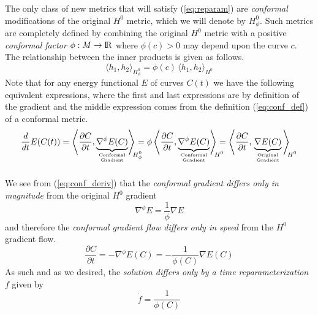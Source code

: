 \documentclass[twoside,a4paper,english]{article}
\newcommand\deriv[2][]{\frac{d #1}{d #2}}
\newcommand\pderiv[2][]{\frac{\partial #1}{\partial #2}}
\begin{document}
The only class of new metrics that will satisfy (\ref{eq:reparam}) are
{\em conformal} modifications of the original $H^0$ metric, which we
will denote by $H^0_\phi$. Such metrics
are completely defined by combining the original $H^0$ metric with a
positive {\em conformal factor} $\phi:M\to{\protect\mathrm{l\hskip-0.15em R}}$ where $\phi(c)>0$ may
depend upon the curve $c$. The relationship between the inner products
is given as follows.
\begin{equation}\label{eq:conf_def}
  \Big\langle h_1,h_2\Big\rangle_{\!H^0_\phi}=
  \phi(c)\,\Big\langle h_1,h_2\Big\rangle_{\!H^0}
\end{equation}
Note that for any energy functional $E$ of curves $C(t)$ we have
the following equivalent expressions, where the first and last expressions
are by definition of the gradient and the middle expression comes from
the definition (\ref{eq:conf_def}) of a conformal metric.
\begin{equation}\label{eq:conf_deriv}
  \deriv{t}E(C(t))
   =\left\langle \pderiv[C]{t},
      \underbrace{\nabla^\phi E(C)}_
        {\parbox{3.5em}{\vspace{-2.5ex}\tiny\begin{center}Conformal\\Gradient\end{center}}}
    \right\rangle_{\!\!\raisebox{4ex}{$\scriptstyle H^0_\phi$}}
   \!\!\!\!\!
   =\phi\left\langle \pderiv[C]{t},
      \underbrace{\nabla^\phi E(C)}_
        {\parbox{3.5em}{\vspace{-2.5ex}\tiny\begin{center}Conformal\\Gradient\end{center}}}
    \right\rangle_{\!\!\raisebox{4ex}{$\scriptstyle H^0$}}
   \!\!\!\!\!
   =\left\langle \pderiv[C]{t},
      \underbrace{\nabla E(C)}_
        {\parbox{3.5em}{\vspace{-2.5ex}\tiny\begin{center}Original\\Gradient\end{center}}}
    \right\rangle_{\!\!\raisebox{4ex}{$\scriptstyle H^0$}}
\end{equation}
We see from (\ref{eq:conf_deriv}) that the 
{\em conformal gradient differs only in magnitude} from the original
$H^0$ gradient
$$
  \nabla^\phi E = \frac 1{\phi} \nabla E
$$
and therefore the {\em conformal gradient flow differs only in speed}
from the $H^0$ gradient flow.
$$ \pderiv[C]{t} = - \nabla^\phi E(C) = -\frac 1{\phi(C)} \nabla E(C) $$
As such and as we desired, the
{\em solution differs only by a time reparameterization $f$} given by
$$ \dot{f}=\frac 1{\phi(C)}$$
\end{document}
